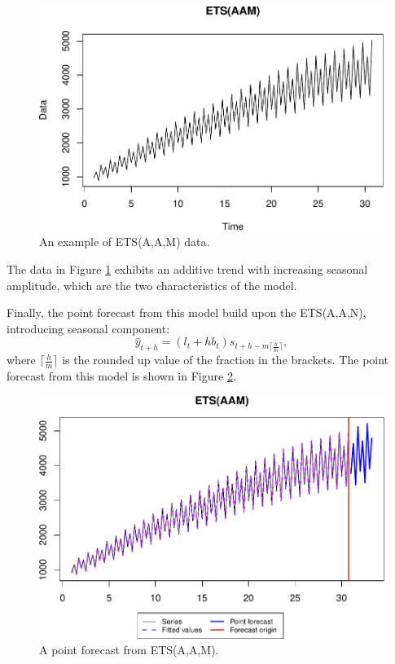 \documentclass[
]{book}
\theoremstyle{definition}
\theoremstyle{definition}
\theoremstyle{definition}
\theoremstyle{definition}
\theoremstyle{remark}
\begin{document}
\begin{figure}
\centering
\includegraphics{adam_files/figure-latex/ETSAAMExample-1.pdf}
\caption{\label{fig:ETSAAMExample}An example of ETS(A,A,M) data.}
\end{figure}

The data in Figure \ref{fig:ETSAAMExample} exhibits an additive trend with increasing seasonal amplitude, which are the two characteristics of the model.

Finally, the point forecast from this model build upon the ETS(A,A,N), introducing seasonal component:
\begin{equation}
    \hat{y}_{t+h} = (l_{t} + h b_t) s_{t+h-m\lceil\frac{h}{m}\rceil},
  \label{eq:ETSAANForecast}
\end{equation}
where \(\lceil\frac{h}{m}\rceil\) is the rounded up value of the fraction in the brackets. The point forecast from this model is shown in Figure \ref{fig:ETSAAMExampleForecast}.

\begin{figure}
\centering
\includegraphics{adam_files/figure-latex/ETSAAMExampleForecast-1.pdf}
\caption{\label{fig:ETSAAMExampleForecast}A point forecast from ETS(A,A,M).}
\end{figure}
\end{document}
